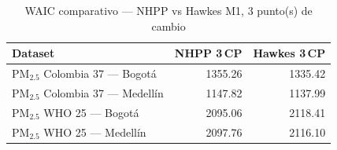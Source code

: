 \begin{table}[htbp]
\centering
\caption{WAIC comparativo --- NHPP vs Hawkes M1, 3 punto(s) de cambio}
\label{tab:comp_waic_3cp}
\begin{tabular}{lrr}
\toprule
Dataset & NHPP 3\,CP & Hawkes 3\,CP \\
\midrule
PM$_{2.5}$ Colombia 37 --- Bogot\'{a} & 1355.26 & 1335.42 \\
PM$_{2.5}$ Colombia 37 --- Medell\'{i}n & 1147.82 & 1137.99 \\
PM$_{2.5}$ WHO 25 --- Bogot\'{a} & 2095.06 & 2118.41 \\
PM$_{2.5}$ WHO 25 --- Medell\'{i}n & 2097.76 & 2116.10 \\
\bottomrule
\end{tabular}
\end{table}
